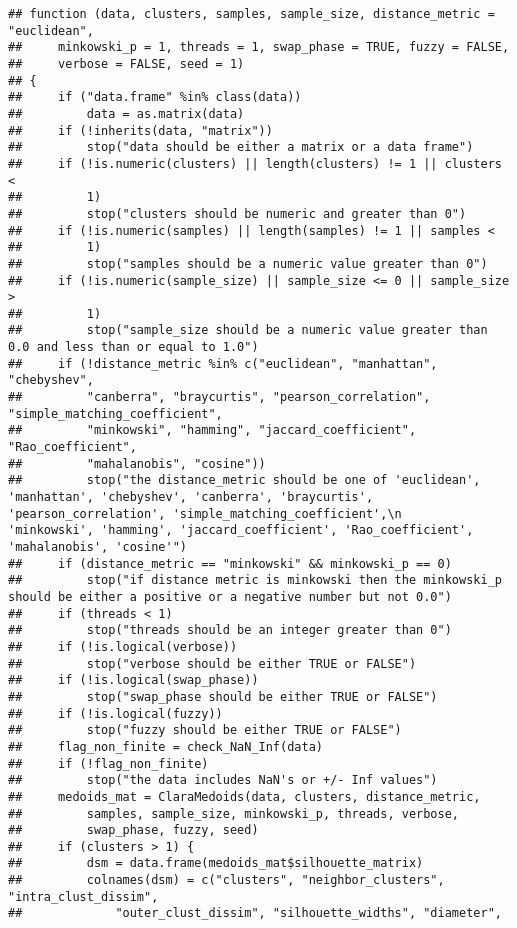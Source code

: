 \documentclass[
]{article}
\begin{document}
\begin{verbatim}
## function (data, clusters, samples, sample_size, distance_metric = "euclidean", 
##     minkowski_p = 1, threads = 1, swap_phase = TRUE, fuzzy = FALSE, 
##     verbose = FALSE, seed = 1) 
## {
##     if ("data.frame" %in% class(data)) 
##         data = as.matrix(data)
##     if (!inherits(data, "matrix")) 
##         stop("data should be either a matrix or a data frame")
##     if (!is.numeric(clusters) || length(clusters) != 1 || clusters < 
##         1) 
##         stop("clusters should be numeric and greater than 0")
##     if (!is.numeric(samples) || length(samples) != 1 || samples < 
##         1) 
##         stop("samples should be a numeric value greater than 0")
##     if (!is.numeric(sample_size) || sample_size <= 0 || sample_size > 
##         1) 
##         stop("sample_size should be a numeric value greater than 0.0 and less than or equal to 1.0")
##     if (!distance_metric %in% c("euclidean", "manhattan", "chebyshev", 
##         "canberra", "braycurtis", "pearson_correlation", "simple_matching_coefficient", 
##         "minkowski", "hamming", "jaccard_coefficient", "Rao_coefficient", 
##         "mahalanobis", "cosine")) 
##         stop("the distance_metric should be one of 'euclidean', 'manhattan', 'chebyshev', 'canberra', 'braycurtis', 'pearson_correlation', 'simple_matching_coefficient',\n         'minkowski', 'hamming', 'jaccard_coefficient', 'Rao_coefficient', 'mahalanobis', 'cosine'")
##     if (distance_metric == "minkowski" && minkowski_p == 0) 
##         stop("if distance metric is minkowski then the minkowski_p should be either a positive or a negative number but not 0.0")
##     if (threads < 1) 
##         stop("threads should be an integer greater than 0")
##     if (!is.logical(verbose)) 
##         stop("verbose should be either TRUE or FALSE")
##     if (!is.logical(swap_phase)) 
##         stop("swap_phase should be either TRUE or FALSE")
##     if (!is.logical(fuzzy)) 
##         stop("fuzzy should be either TRUE or FALSE")
##     flag_non_finite = check_NaN_Inf(data)
##     if (!flag_non_finite) 
##         stop("the data includes NaN's or +/- Inf values")
##     medoids_mat = ClaraMedoids(data, clusters, distance_metric, 
##         samples, sample_size, minkowski_p, threads, verbose, 
##         swap_phase, fuzzy, seed)
##     if (clusters > 1) {
##         dsm = data.frame(medoids_mat$silhouette_matrix)
##         colnames(dsm) = c("clusters", "neighbor_clusters", "intra_clust_dissim", 
##             "outer_clust_dissim", "silhouette_widths", "diameter", 

\end{verbatim}
\end{document}
